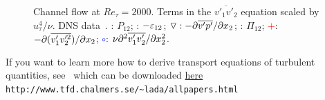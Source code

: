 \begin{figure}[h!]
\centering
\begin{minipage}[b]{0.5\textwidth}
\end{minipage}%
\begin{minipage}[b]{0.5\textwidth}
\end{minipage}
\caption{Channel flow at $Re_\tau=2000$. Terms in the $\overline{v'_1v'_2}$ equation scaled by $u_\tau^4/\nu$.
DNS data~\cite{hoyas:jimenez:06,hoyas:jimenez:web:data}.
\solidline: $P_{12}$;
\dashedline: $-\varepsilon_{12}$;
$\triangledown: -\partial\overline{v'p'}/\partial x_2$;
\dashdottedline: $\Pi_{12}$;
\textcolor{red}{$+$}: $-\partial(\overline{v'_1v^{\prime 2}_2})/\partial x_2$;
\textcolor{blue}{$\circ$}: $\nu \partial^2\overline{v'_1v'_2}/\partial x_2^2$.}
\label{uv_balance}
\end{figure}

If you want to learn more how to derive transport equations of turbulent quantities,
see~\cite{davidson:transport:06} which can be downloaded
\href{http://www.tfd.chalmers.se/~lada/allpapers.html}{here}\\
{\tt http://www.tfd.chalmers.se/\textasciitilde lada/allpapers.html}


\newpage
\appendix



